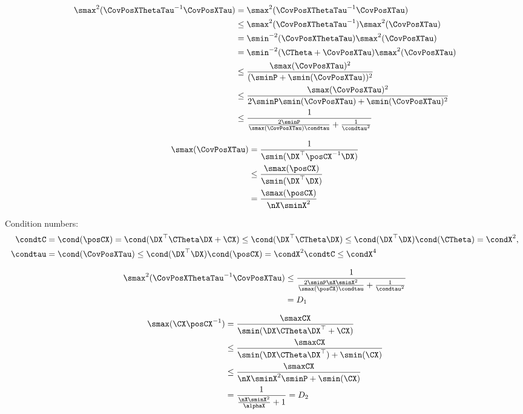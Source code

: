\begin{align}
\smax^2(\CovPosXThetaTau^{-1} \CovPosXTau)
&= \smax^2(\CovPosXThetaTau^{-1}\CovPosXTau) \\
&\le \smax^2(\CovPosXThetaTau^{-1}) \smax^2(\CovPosXTau) \\
&= \smin^{-2}(\CovPosXThetaTau) \smax^2(\CovPosXTau) \\
&= \smin^{-2}(\CTheta + \CovPosXTau) \smax^2(\CovPosXTau) \\
&\le \frac{\smax(\CovPosXTau)^2}{(\sminP + \smin(\CovPosXTau))^2} \\
&\le \frac{\smax(\CovPosXTau)^2}{2\sminP\smin(\CovPosXTau) + \smin(\CovPosXTau)^2} \\
&\le \frac{1}{\frac{2\sminP}{\smax(\CovPosXTau) \condtau} + \frac{1}{\condtau^2}} \\
\end{align}

\begin{align}
\smax(\CovPosXTau) &= \frac{1}{\smin(\DX^\top \posCX^{-1} \DX)} \\
&\le \frac{\smax(\posCX)}{\smin(\DX^\top \DX)} \\
&= \frac{\smax(\posCX)}{\nX \sminX^2}
\end{align}

Condition numbers:
\begin{align}
\condtC &= \cond(\posCX) = \cond(\DX^\top \CTheta \DX + \CX) 
\le \cond(\DX^\top \CTheta \DX) \le \cond(\DX^\top \DX) \cond(\CTheta) = \condX^2,\\
\condtau &= \cond(\CovPosXTau) \le \cond(\DX^\top \DX) \cond(\posCX) = \condX^2 \condtC \le \condX^4
\end{align}

\begin{align}
\smax^2(\CovPosXThetaTau^{-1} \CovPosXTau)
&\le \frac{1}{\frac{2\sminP\nX \sminX^2}{\smax(\posCX) \condtau} + \frac{1}{\condtau^2}} \\
&= D_1
\end{align}

\begin{align}
\smax(\CX \posCX^{-1}) &= \frac{\smaxCX}{\smin(\DX \CTheta \DX^\top + \CX)} \\
&\le\frac{\smaxCX}{\smin(\DX \CTheta \DX^\top) + \smin(\CX)}\\
&\le\frac{\smaxCX}{\nX\sminX^2 \sminP + \smin(\CX)}\\
&=\frac{1}{ \frac{\nX\sminX^2}{\alphaX} + 1} = D_2
\end{align}

